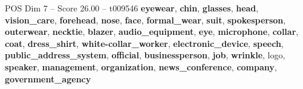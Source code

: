 \begin{textsample}{POS Dim 7 – Score 26.00 – t009546}  \label{ex:f7_pos_040}
\textbf{eyewear}, \textbf{chin}, \textbf{glasses}, \textbf{head}, \textbf{vision\_care}, \textbf{forehead}, \textbf{nose}, \textbf{face}, \textbf{formal\_wear}, \textbf{suit}, \textbf{spokesperson}, \textbf{outerwear}, \textbf{necktie}, \textbf{blazer}, \textbf{audio\_equipment}, \textbf{eye}, \textbf{microphone}, \textbf{collar}, \textbf{coat}, \textbf{dress\_shirt}, \textbf{white-collar\_worker}, \textbf{electronic\_device}, \textbf{speech}, \textbf{public\_address\_system}, \textbf{official}, \textbf{businessperson}, \textbf{job}, \textbf{wrinkle}, logo, \textbf{speaker}, \textbf{management}, \textbf{organization}, \textbf{news\_conference}, \textbf{company}, \textbf{government\_agency}

\end{textsample}
